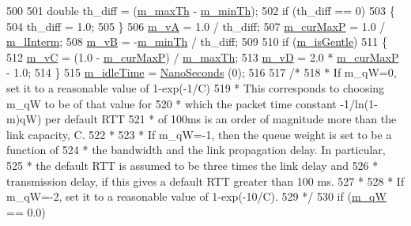 \begin{DoxyCode}
500 
501   \textcolor{keywordtype}{double} th\_diff = (\hyperlink{classns3_1_1RedQueueDisc_a631761d4c950b0408ba26f42a0509c42}{m\_maxTh} - \hyperlink{classns3_1_1RedQueueDisc_a6c2f13710a589ca7a43e06d16bd889ee}{m\_minTh});
502   \textcolor{keywordflow}{if} (th\_diff == 0)
503     \{
504       th\_diff = 1.0; 
505     \}
506   \hyperlink{classns3_1_1RedQueueDisc_a03f1bf584c3f8f07a33719f54b73dd76}{m\_vA} = 1.0 / th\_diff;
507   \hyperlink{classns3_1_1RedQueueDisc_af00e660caa4f7360e23b9f667382b1c6}{m\_curMaxP} = 1.0 / \hyperlink{classns3_1_1RedQueueDisc_a7ac61b7250a5d9af2fcba2a55e0d3256}{m\_lInterm};
508   \hyperlink{classns3_1_1RedQueueDisc_a983ababdb1d4eecd65c2f08af7ab5cd3}{m\_vB} = -\hyperlink{classns3_1_1RedQueueDisc_a6c2f13710a589ca7a43e06d16bd889ee}{m\_minTh} / th\_diff;
509 
510   \textcolor{keywordflow}{if} (\hyperlink{classns3_1_1RedQueueDisc_ad9c91813fb21151ac137681a2b1fb0c8}{m\_isGentle})
511     \{
512       \hyperlink{classns3_1_1RedQueueDisc_ae06b2dbe2b79013c1b7682bbda4fd182}{m\_vC} = (1.0 - \hyperlink{classns3_1_1RedQueueDisc_af00e660caa4f7360e23b9f667382b1c6}{m\_curMaxP}) / \hyperlink{classns3_1_1RedQueueDisc_a631761d4c950b0408ba26f42a0509c42}{m\_maxTh};
513       \hyperlink{classns3_1_1RedQueueDisc_ace5d2581758baa698fc2e5ebe4842026}{m\_vD} = 2.0 * \hyperlink{classns3_1_1RedQueueDisc_af00e660caa4f7360e23b9f667382b1c6}{m\_curMaxP} - 1.0;
514     \}
515   \hyperlink{classns3_1_1RedQueueDisc_a004c1bec6f513969e91ddd353bd336e2}{m\_idleTime} = \hyperlink{group__timecivil_ga281d64bcb4dad96267d83c7688ec433f}{NanoSeconds} (0);
516 
517 \textcolor{comment}{/*}
518 \textcolor{comment}{ * If m\_qW=0, set it to a reasonable value of 1-exp(-1/C)}
519 \textcolor{comment}{ * This corresponds to choosing m\_qW to be of that value for}
520 \textcolor{comment}{ * which the packet time constant -1/ln(1-m)qW) per default RTT }
521 \textcolor{comment}{ * of 100ms is an order of magnitude more than the link capacity, C.}
522 \textcolor{comment}{ *}
523 \textcolor{comment}{ * If m\_qW=-1, then the queue weight is set to be a function of}
524 \textcolor{comment}{ * the bandwidth and the link propagation delay.  In particular, }
525 \textcolor{comment}{ * the default RTT is assumed to be three times the link delay and }
526 \textcolor{comment}{ * transmission delay, if this gives a default RTT greater than 100 ms. }
527 \textcolor{comment}{ *}
528 \textcolor{comment}{ * If m\_qW=-2, set it to a reasonable value of 1-exp(-10/C).}
529 \textcolor{comment}{ */}
530   \textcolor{keywordflow}{if} (\hyperlink{classns3_1_1RedQueueDisc_aed406d18723a07fe991497553abed6da}{m\_qW} == 0.0)

\end{DoxyCode}
